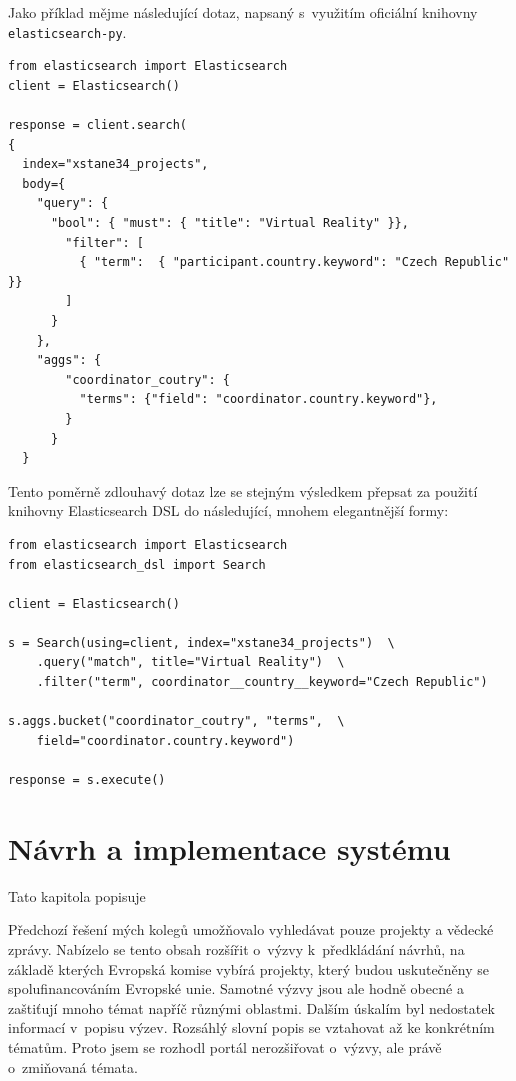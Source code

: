 Jako příklad mějme následující dotaz, napsaný s~využitím oficiální knihovny \texttt{elasticsearch-py}.
\begin{verbatim}
from elasticsearch import Elasticsearch
client = Elasticsearch()

response = client.search(
{
  index="xstane34_projects",
  body={
    "query": { 
      "bool": { "must": { "title": "Virtual Reality" }}, 
        "filter": [ 
          { "term":  { "participant.country.keyword": "Czech Republic" }}
        ]
      }
    },
    "aggs": {
        "coordinator_coutry": {
          "terms": {"field": "coordinator.country.keyword"},
        }
      }
  }
\end{verbatim}

Tento poměrně zdlouhavý dotaz lze se stejným výsledkem přepsat za použití knihovny Elasticsearch DSL do následující, mnohem elegantnější formy:

\begin{verbatim}
from elasticsearch import Elasticsearch
from elasticsearch_dsl import Search

client = Elasticsearch()

s = Search(using=client, index="xstane34_projects")  \
    .query("match", title="Virtual Reality")  \
    .filter("term", coordinator__country__keyword="Czech Republic")

s.aggs.bucket("coordinator_coutry", "terms",  \
    field="coordinator.country.keyword")

response = s.execute()
\end{verbatim}

\blindtext[2]





\chapter{Návrh a implementace systému}
Tato kapitola popisuje \blindtext

Předchozí řešení mých kolegů umožňovalo vyhledávat pouze projekty a vědecké zprávy. Nabízelo se tento obsah rozšířit o~výzvy k~předkládání návrhů, na základě kterých Evropská komise vybírá projekty, který budou uskutečněny se spolufinancováním Evropské unie.
Samotné výzvy jsou ale hodně obecné a zaštiťují mnoho témat napříč různými oblastmi. Dalším úskalím byl nedostatek informací v~popisu výzev. Rozsáhlý slovní popis se vztahovat až ke konkrétním tématům. Proto jsem se rozhodl portál nerozšiřovat o~výzvy, ale právě o~zmiňovaná témata.

